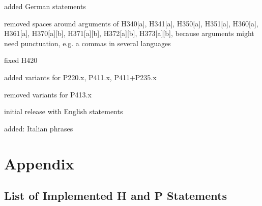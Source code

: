 \documentclass[a4paper,notitlepage,parskip=half]{scrreprt}
\begin{document}
\begin{compactitem}
\item added German statements
\item removed spaces around arguments of H340[a], H341[a], H350[a], H351[a], 
  H360[a], H361[a], H370[a][b], H371[a][b], H372[a][b], H373[a][b], because 
  arguments might need punctuation, e.g. a commas in several languages
\item fixed H420
\item added variants for P220.x, P411.x, P411+P235.x
\item removed variants for P413.x
\end{compactitem}

\begin{compactitem}
\item initial release with English statements
\end{compactitem}

\begin{compactitem}
  \item added: Italian phrases
\end{compactitem}



\appendix
\chapter{Appendix}

\section{List of Implemented H and P Statements}
\end{document}

